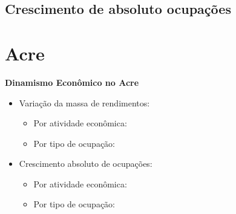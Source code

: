 \documentclass[8pt]{beamer}
\begin{document}
\begin{frame}
\textit{\hyperlink{indice_principal_amz}{}}

\end{frame}

\subsection{Crescimento de absoluto ocupações}

\begin{frame}
\textit{\hyperlink{indice_principal_amz}{}}

\end{frame}

\begin{frame}
\textit{\hyperlink{indice_principal_amz}{}}

\end{frame}

\section{Acre}

\begin{frame}[label=indice_principal_amz_ac]{}

\textit{\hyperlink{indice_principal}{}}

\textbf{Dinamismo Econômico no Acre}
\vspace{2mm}

\begin{itemize}

\item{Variação da massa de rendimentos:
	\begin{itemize}
	\item{Por atividade econômica: \hyperlink{amzacrkngvmassaporcnae2dig}{}}
	\item{Por tipo de ocupação: \hyperlink{amzacrkngvmassaporcod2dig}{}}
	\end{itemize}
}
\vspace{1mm}

\item{Crescimento  absoluto de ocupações:
	\begin{itemize}
	\item{Por atividade econômica: \hyperlink{amzacrkngnocuporcnae2dig}{}}
	\item{Por tipo de ocupação: \hyperlink{amzacrkngnocuporcod2dig}{}}
	\end{itemize}
}
\vspace{1mm}

\end{itemize}

\end{frame}
\end{document}
